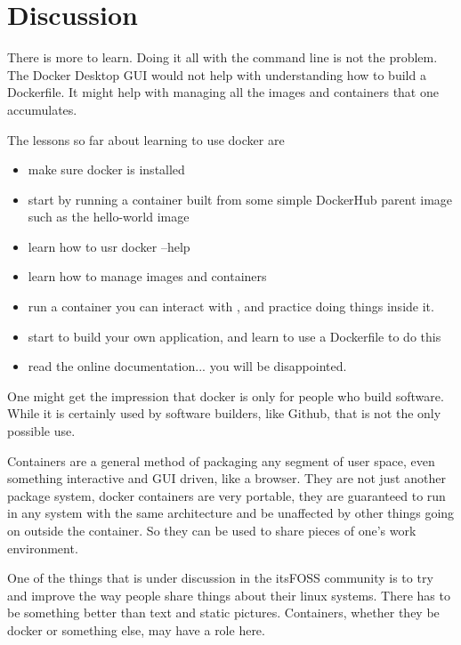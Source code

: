 \documentclass{article}  %
\begin{document}
\section{Discussion}
There is more to learn. Doing it all with the command line is not the problem. The Docker Desktop GUI would not help with understanding how to build a Dockerfile. It might help with managing all the images and containers that one accumulates. 

The lessons so far about learning to use docker are
\begin{itemize}
\item make sure docker is installed
\item start by running a container built from some simple DockerHub parent image such as the hello-world image
\item learn how to usr docker --help
\item learn how to manage images and containers
\item run a container you can interact with , and practice doing things inside it.
\item start to build your own application, and learn to use a Dockerfile to do this
\item read the online documentation... you will be disappointed.
\end{itemize}

One might get the impression that docker is only for people who build software.  While it is certainly used by software builders, like Github, that is not the only possible use. 

Containers are a general method of packaging any segment of user space, even something interactive and GUI driven, like a browser.  They are not just another package system, docker containers are very portable, they are guaranteed to run in any system with the same architecture and be unaffected by other things going on outside the container. So they can be used to share pieces of one's work environment. 

One of the things that is under discussion in the itsFOSS community is to try and improve the way people share things about their linux systems. There has to be something better than text and static pictures. Containers, whether they be docker or something else, may have a role here.
\end{document}
